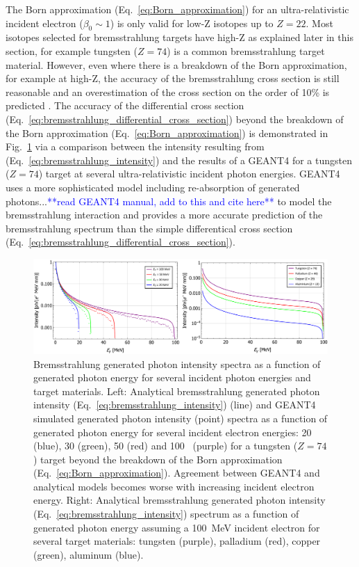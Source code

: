 \documentclass[../main.tex]{subfiles}
\begin{document}
The Born approximation (Eq.~\ref{eq:Born_approximation}) for an ultra-relativistic incident electron ($\beta_{0}\sim 1$) is only valid for low-Z isotopes up to $Z = 22$. Most isotopes selected for bremsstrahlung targets have high-Z as explained later in this section, for example tungsten ($Z = 74$) is a common bremsstrahlung target material. However, even where there is a breakdown of the Born approximation, for example at high-Z, the accuracy of the bremsstrahlung cross section is still reasonable \cite{koch1959bremsstrahlung} and an overestimation of the cross section on the order of 10\% is predicted \cite{olsen1957theory}. The accuracy of the differential cross section (Eq.~\ref{eq:bremsstrahlung_differential_cross_section}) beyond the breakdown of the Born approximation (Eq.~\ref{eq:Born_approximation}) is demonstrated in Fig.~\ref{fig:BremIntensityEZ} via a comparison between the intensity resulting from (Eq.~\ref{eq:bremsstrahlung_intensity}) and the results of a \textsc{GEANT4} \cite{agostinelli2003geant4} for a tungsten ($Z = 74$) target at several ultra-relativistic incident photon energies. \textsc{GEANT4} uses a more sophisticated model including re-absorption of generated photons...\textcolor{blue}{**read GEANT4 manual, add to this and cite here**} to model the bremsstrahlung interaction and provides a more accurate prediction of the bremsstrahlung spectrum than the simple differentical cross section (Eq.~\ref{eq:bremsstrahlung_differential_cross_section}).   
\begin{figure}[!h]
\centering
\includegraphics[width=\textwidth]{Figures/DIANA_Inverse_Compton_Source_Design/BremIntensityEZ.pdf}
\caption{Bremsstrahlung generated photon intensity spectra as a function of generated photon energy for several incident photon energies and target materials. Left: Analytical bremsstrahlung generated photon intensity (Eq.~\ref{eq:bremsstrahlung_intensity}) (line) and \textsc{GEANT4} simulated generated photon intensity (point) spectra as a function of generated photon energy for several incident electron energies: 20 (blue), 30 (green), 50 (red) and 100~\si{\megaelectronvolt} (purple) for a tungsten ($Z = 74$) target beyond the breakdown of the Born approximation (Eq.~\ref{eq:Born_approximation}). Agreement between \textsc{GEANT4} and analytical models becomes worse with increasing incident electron energy. Right: Analytical bremsstrahlung generated photon intensity (Eq.~\ref{eq:bremsstrahlung_intensity}) spectrum as a function of generated photon energy assuming a 100~\si{\mega\electronvolt} incident electron for several target materials: tungsten (purple), palladium (red), copper (green), aluminum (blue).}
\label{fig:BremIntensityEZ}
\end{figure}
\end{document}
